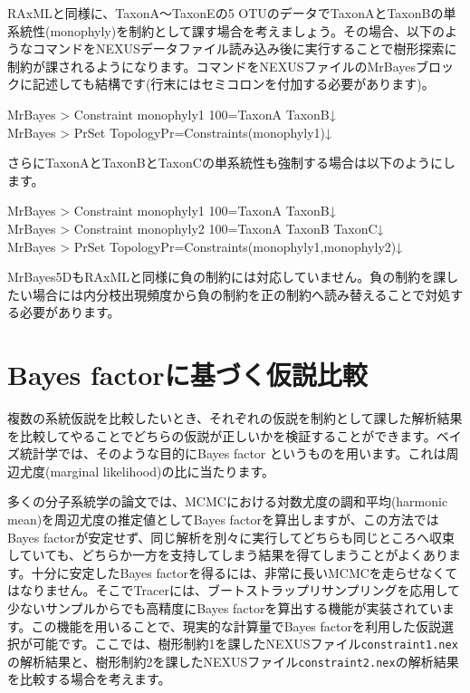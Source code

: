 \documentclass[titlepage,10pt,a4paper]{jsbook}
\newenvironment{cmd}{\begin{oframed}\raggedright\ttfamily\footnotesize\setlength{\baselineskip}{1.4em}}{\end{oframed}\vspace{-1em}}
\begin{document}
RAxMLと同様に、TaxonA～TaxonEの5 OTUのデータでTaxonAとTaxonBの単系統性(monophyly)を制約として課す場合を考えましょう。その場合、以下のようなコマンドをNEXUSデータファイル読み込み後に実行することで樹形探索に制約が課されるようになります。コマンドをNEXUSファイルのMrBayesブロックに記述しても結構です(行末にはセミコロンを付加する必要があります)。
\begin{cmd}
MrBayes {\textgreater} Constraint monophyly1 100=TaxonA TaxonB↓\\
MrBayes {\textgreater} PrSet TopologyPr=Constraints(monophyly1)↓
\end{cmd}
さらにTaxonAとTaxonBとTaxonCの単系統性も強制する場合は以下のようにします。
\begin{cmd}
MrBayes {\textgreater} Constraint monophyly1 100=TaxonA TaxonB↓\\
MrBayes {\textgreater} Constraint monophyly2 100=TaxonA TaxonB TaxonC↓\\
MrBayes {\textgreater} PrSet TopologyPr=Constraints(monophyly1,monophyly2)↓
\end{cmd}
MrBayes5DもRAxMLと同様に負の制約には対応していません。負の制約を課したい場合には内分枝出現頻度から負の制約を正の制約へ読み替えることで対処する必要があります。

\section{Bayes factorに基づく仮説比較}

複数の系統仮説を比較したいとき、それぞれの仮説を制約として課した解析結果を比較してやることでどちらの仮説が正しいかを検証することができます。ベイズ統計学では、そのような目的にBayes factor \citep{Kass1995}というものを用います。これは周辺尤度(marginal likelihood)の比に当たります。

多くの分子系統学の論文では、MCMCにおける対数尤度の調和平均(harmonic mean)を周辺尤度の推定値としてBayes factorを算出しますが、この方法ではBayes factorが安定せず、同じ解析を別々に実行してどちらも同じところへ収束していても、どちらか一方を支持してしまう結果を得てしまうことがよくあります。十分に安定したBayes factorを得るには、非常に長いMCMCを走らせなくてはなりません。そこでTracerには、ブートストラップリサンプリングを応用して少ないサンプルからでも高精度にBayes factorを算出する機能が実装されています\citep{Newton1994}。この機能を用いることで、現実的な計算量でBayes factorを利用した仮説選択が可能です。ここでは、樹形制約1を課したNEXUSファイル\texttt{constraint1.nex}の解析結果と、樹形制約2を課したNEXUSファイル\texttt{constraint2.nex}の解析結果を比較する場合を考えます。
\end{document}
